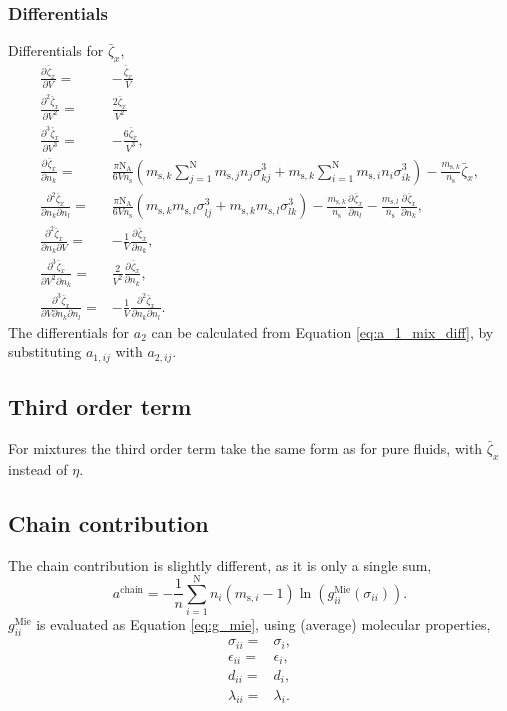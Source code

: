 \documentclass[english]{../thermomemo/thermomemo}
\newcommand*{\pd}[3][]{\frac{\partial^{#1}#2}{\partial{#3}^{#1}}}%
\newcommand*{\pdc}[3]{\frac{\partial^{2}#1}{\partial{#2}\partial{#3}}}%
\newcommand*{\pdcc}[3]{\frac{\partial^{3}#1}{\partial{#2}^{2}\partial{#3}}}%
\newcommand*{\pdth}[4]{\frac{\partial^{3}#1}{\partial{#2}\partial{#3}\partial{#4}}}%
\newcommand*{\lb}{\left(}
\newcommand*{\rb}{\right)}
\newcommand{\mie}{\text{Mie}\xspace}
\newcommand{\chain}{\ensuremath{\text{chain}}\xspace}
\newcommand{\seg}{\ensuremath{\text{s}}\xspace}
\newcommand{\zb}{\bar{\zeta}}
\newcommand{\nc}{\ensuremath{\text{N}}\xspace}
\newcommand{\NA}{\ensuremath{\text{N}_{\text{A}}}\xspace}
\begin{document}
\subsubsection{Differentials}
Differentials for $\zb_x$,
\begin{align}
  \label{eq:zb_x_diff}
  \pd{\zb_{x}}{V} =& -\frac{\zb_{x}}{V} \\
  \pd[2]{\zb_{x}}{V} =& \frac{2\zb_{x}}{V^2}\\
  \pd[3]{\zb_x}{V} =& -\frac{6\zb_x}{V^3},\\
  \pd{\zb_{x}}{n_k} =& \frac{\pi \NA}{6 V n_\seg} \lb m_{\seg,k} \sum_{j=1}^\nc m_{\seg,j}n_j \sigma_{kj}^3  + m_{\seg,k} \sum_{i=1}^\nc m_{\seg,i}n_i \sigma_{ik}^3\rb - \frac{m_{\seg,k}}{n_\seg} \zb_{x},\\
  \pdc{\zb_{x}}{n_k}{n_l} =& \frac{\pi \NA}{6 V n_\seg} \lb m_{\seg,k} m_{\seg,l} \sigma_{lj}^3  + m_{\seg,k}m_{\seg,l} \sigma_{lk}^3\rb - \frac{m_{\seg,k}}{n_\seg} \pd{\zb_{x}}{n_l} - \frac{m_{\seg,l}}{n_\seg} \pd{\zb_{x}}{n_k}, \\
  \pdc{\zb_{x}}{n_k}{V} =& -\frac{1}{V} \pd{\zb_{x}}{n_k},\\
  \pdcc{\zb_{x}}{V}{n_k} =& \frac{2}{V^2}\pd{\zb_{x}}{n_k},\\
  \pdth{\zb_{x}}{V}{n_k}{n_l} =& -\frac{1}{V}\pdc{\zb_{x}}{n_k}{n_l}.
\end{align}
The differentials for $a_2$ can be calculated from Equation
\ref{eq:a_1_mix_diff}, by substituting $a_{1,ij}$ with $a_{2,ij}$.
\subsection{Third order term}
For mixtures the third order term take the same form as for pure
fluids, with $\zb_x$ instead of $\eta$.

\subsection{Chain contribution}
The chain contribution is slightly different, as it is only a single sum,
\begin{equation}
  \label{eq:a_chain_mixtures}
  a^\chain = -\frac{1}{n}\sum_{i=1}^\nc n_i\lb m_{\seg,i} -1\rb \ln \lb g_{ii}^\mie \lb \sigma_{ii} \rb \rb.
\end{equation}
$g_{ii}^\mie$ is evaluated as Equation \ref{eq:g_mie}, using (average) molecular properties,
\begin{align}
  \label{eq:a_chain_mixtures_param}
  \sigma_{ii} =& \sigma_i,\\
  \epsilon_{ii} =& \epsilon_i,\\
  d_{ii} =& d_i,\\
  \lambda_{ii} =& \lambda_i.
\end{align}
\end{document}
